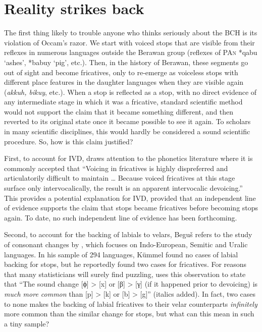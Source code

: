 \documentclass[output=paper]{langscibook}
\begin{document}
\section{Reality strikes back}\label{sec:Reality-Strikes-Back}
 The first thing likely to trouble anyone who thinks seriously about the BCH is its violation of Occam’s razor.  We start with voiced stops that are visible from their reflexes in numerous languages outside the Berawan group (reflexes of \textsc{PAn} *qabu ‘ashes’, *babuy ‘pig’, etc.).  Then, in the history of Berawan, these segments go out of sight and become fricatives, only to re-emerge as voiceless stops with different place features in the daughter languages when they are visible again (\textit{akkuh, bikuy}, etc.). When a stop is reflected as a stop, with no direct evidence of any intermediate stage in which it was a fricative, standard scientific method would not support the claim that it became something different, and then reverted to its original state once it became possible to see it again. To scholars in many scientific disciplines, this would hardly be considered a sound scientific procedure. So, how is this claim justified?

First, to account for IVD, \citet[127]{Beguš2018} draws attention to the phonetics literature where it is commonly accepted that “Voicing in fricatives is highly dispreferred and articulatorily difficult to maintain … Because voiced fricatives at this stage surface only intervocalically, the result is an apparent intervocalic devoicing.” This provides a potential explanation for IVD, provided that an independent line of evidence supports the claim that stops became fricatives before becoming stops again. To date, no such independent line of evidence has been forthcoming.

Second, to account for the backing of labials to velars, Beguš refers to the study of consonant changes by \citet{Kümmel2007}, which focuses on Indo-European, Semitic and Uralic languages. In his sample of 294 languages, Kümmel found no cases of labial backing for stops, but he reportedly found two cases for fricatives. For reasons that many statisticians will surely find puzzling, \citet[128]{Beguš2018} uses this observation to state that “The sound change [ϕ] > [x] or [β] > [γ] (if it happened prior to devoicing) is \textit{much more common} than [p] > [k] or [b] > [g]” (italics added). In fact, two cases to none makes the backing of labial fricatives to their velar counterparts \textit{infinitely} more common than the similar change for stops, but what can this mean in such a tiny sample?
\end{document}
